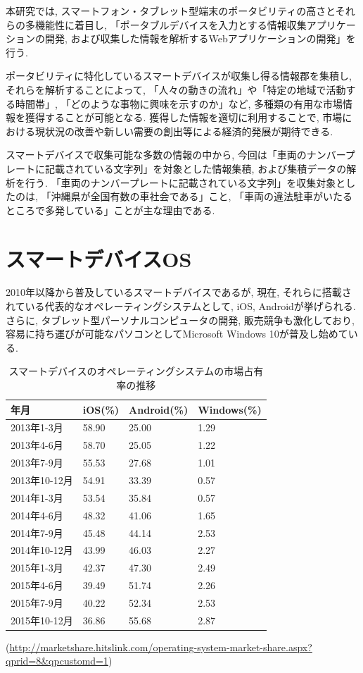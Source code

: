 本研究では, スマートフォン・タブレット型端末のポータビリティの高さとそれらの多機能性に着目し, 「ポータブルデバイスを入力とする情報収集アプリケーションの開発, および収集した情報を解析するWebアプリケーションの開発」を行う.

ポータビリティに特化しているスマートデバイスが収集し得る情報郡を集積し, それらを解析することによって, 「人々の動きの流れ」や「特定の地域で活動する時間帯」, 「どのような事物に興味を示すのか」など, 多種類の有用な市場情報を獲得することが可能となる.
獲得した情報を適切に利用することで, 市場における現状況の改善や新しい需要の創出等による経済的発展が期待できる.

スマートデバイスで収集可能な多数の情報の中から, 今回は「車両のナンバープレートに記載されている文字列」を対象とした情報集積, および集積データの解析を行う.
「車両のナンバープレートに記載されている文字列」を収集対象としたのは, 「沖縄県が全国有数の車社会である」こと, 「車両の違法駐車がいたるところで多発している」ことが主な理由である.

\section{スマートデバイスOS}
2010年以降から普及しているスマートデバイスであるが, 現在, それらに搭載されている代表的なオペレーティングシステムとして, iOS, Androidが挙げられる.
さらに, タブレット型パーソナルコンピュータの開発, 販売競争も激化しており, 容易に持ち運びが可能なパソコンとしてMicrosoft Windows 10が普及し始めている.

\begin{table}[tb]
\begin{center}
\begin{tabular}{|l|p{2.5cm}|p{2.5cm}|p{2.5cm}|} \hline
年月 & iOS(\%) & Android(\%) & Windows(\%) \\ \hline \hline
2013年1-3月 & 58.90 & 25.00 & 1.29 \\ \hline
2013年4-6月 & 58.70 & 25.05 & 1.22 \\ \hline
2013年7-9月 & 55.53 & 27.68 & 1.01 \\ \hline
2013年10-12月 & 54.91 & 33.39 & 0.57 \\ \hline
2014年1-3月 & 53.54 & 35.84 & 0.57 \\ \hline
2014年4-6月 & 48.32 & 41.06 & 1.65 \\ \hline
2014年7-9月 & 45.48 & 44.14 & 2.53 \\ \hline
2014年10-12月 & 43.99 & 46.03 & 2.27 \\ \hline
2015年1-3月 & 42.37 & 47.30 & 2.49 \\ \hline
2015年4-6月 & 39.49 & 51.74 & 2.26 \\ \hline
2015年7-9月 & 40.22 & 52.34 & 2.53 \\ \hline
2015年10-12月 & 36.86 & 55.68 & 2.87 \\ \hline
\end{tabular}
\caption{スマートデバイスのオペレーティングシステムの市場占有率の推移}
\end{center}
\begin{flushright}
(\url{http://marketshare.hitslink.com/operating-system-market-share.aspx?qprid=8&qpcustomd=1})
\end{flushright}
\end{table}

